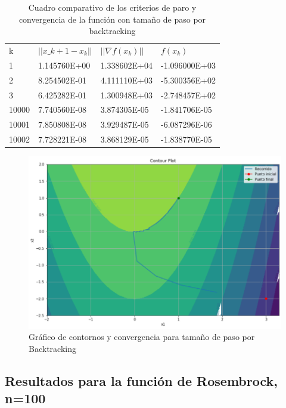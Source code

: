 \documentclass[journal]{IEEEtran}
\begin{document}
\begin{table}[H]
\begin{tabular}{@{}llll@{}}
k & $||x\_{k+1}-x_k||$ & $||\nabla f(x_k)||$ & $f(x_k)$ \\
1  &  1.145760E+00 &  1.338602E+04   &  -1.096000E+03  \\
2  &  8.254502E-01 &  4.111110E+03   &  -5.300356E+02  \\
3  &  6.425282E-01 &  1.300948E+03   &  -2.748457E+02  \\
10000  &  7.740560E-08 &  3.874305E-05   &  -1.841706E-05 \\
10001  &  7.850808E-08 &  3.929487E-05   &  -6.087296E-06  \\
10002  &  7.728221E-08 &  3.868129E-05   &  -1.838770E-05
\end{tabular}
\caption{Cuadro comparativo de los criterios de paro y convergencia de la función con tamaño de paso por backtracking}
\end{table}

\begin{figure}[H]
    \centering
    \includegraphics[scale=0.25]{3.png}
    \caption{Gráfico de contornos y convergencia para tamaño de paso por Backtracking}
    \label{k}
\end{figure}

\subsection{Resultados para la función de Rosembrock, n=100}
\end{document}
